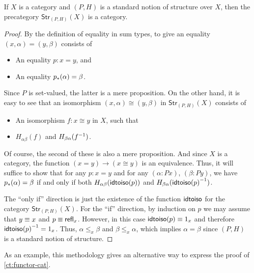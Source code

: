 \begin{thm}\label{thm:sip}
  If $X$ is a category and $(P,H)$ is a standard notion of structure over $X$, then the precategory $\mathsf{Str}_{(P,H)}(X)$ is a category.
\end{thm}
\begin{proof}
  By the definition of equality in sum types, to give an equality $(x,\alpha)=(y,\beta)$ consists of
  \begin{itemize}
  \item An equality $p:x=y$, and
  \item An equality ${p}_{*}\mathopen{}\left({\alpha}\right)\mathclose{}=\beta$.
  \end{itemize}
  Since $P$ is set-valued, the latter is a mere proposition.
  On the other hand, it is easy to see that an isomorphism $(x,\alpha)\cong (y,\beta)$ in $\mathsf{Str}_{(P,H)}(X)$ consists of
  \begin{itemize}
  \item An isomorphism $f:x\cong y$ in $X$, such that
  \item $H_{\alpha\beta}(f)$ and $H_{\beta\alpha}({f}^{-1})$.
  \end{itemize}
  Of course, the second of these is also a mere proposition.
  And since $X$ is a category, the function $(x=y) \to (x\cong y)$ is an equivalence.
  Thus, it will suffice to show that for any $p:x=y$ and for any $(\alpha:Px)$, $(\beta:Py)$, we have ${p}_{*}\mathopen{}\left({\alpha}\right)\mathclose{}=\beta$ if and only if both  $H_{\alpha\beta}(\mathsf{idtoiso} (p))$ and $H_{\beta\alpha}({\mathsf{idtoiso}(p)}^{-1})$.

  The ``only if'' direction is just the existence of the function $\mathsf{idtoiso}$ for the category $\mathsf{Str}_{(P,H)}(X)$.
  For the ``if'' direction, by induction on $p$ we may assume that $y\equiv x$ and $p\equiv\mathsf{refl}_{x}$.
  However, in this case $\mathsf{idtoiso} (p)\equiv 1_x$ and therefore ${\mathsf{idtoiso}(p)}^{-1}=1_x$.
  Thus, $\alpha\leq_x \beta$ and $\beta\leq_x \alpha$, which implies $\alpha=\beta$ since $(P,H)$ is a standard notion of structure.
\end{proof}

As an example, this methodology gives an alternative way to express the proof of \autoref{ct:functor-cat}.

